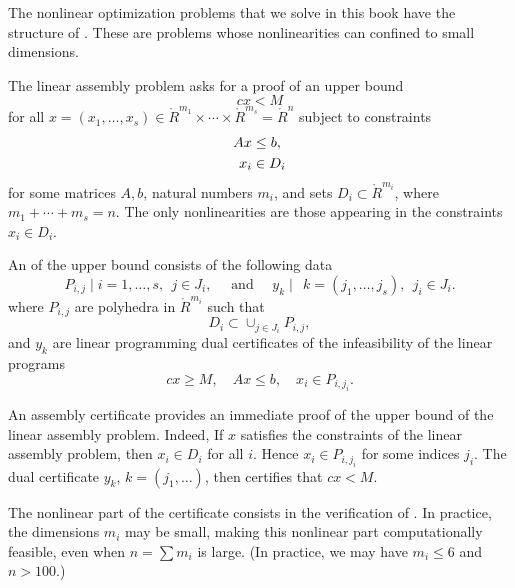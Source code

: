The nonlinear optimization problems that we solve in this book have
the structure of .  These are
problems whose nonlinearities can confined to small dimensions.

The linear assembly problem asks for a proof of an upper bound
\begin{equation}\label{eqn:cxM}
c x < M
\end{equation}
for all $x=(x_1,\ldots,x_s)\in \ring{R}^{m_1}\times\cdots
\times\ring{R}^{m_s}=\ring{R}^n$
subject to constraints
\begin{align}
A x &\le b,\notag\\
x_i &\in D_i\notag
\end{align}
for some matrices $A,b$, natural numbers $m_i$, and sets $D_i\subset
\ring{R}^{m_i}$, where $m_1+\cdots+m_s = n$.  The only nonlinearities
are those appearing in the constraints $x_i\in D_i$.

An  of the upper bound 
consists of the following data
\[
P_{i,j}\mid i=1,\ldots,s,~~j\in J_i,\quad\text{ and }\quad 
y_k\mid~~k=(j_1,\ldots,j_s),~~j_i\in J_i.
\]
where $P_{i,j}$ are polyhedra in $\ring{R}^{m_i}$ such that 
\begin{equation}\label{eqn:DP}
D_i \subset\cup_{j\in J_i} P_{i,j},
\end{equation} and $y_k$ are linear programming
dual certificates of the infeasibility of the linear programs
\[
c x \ge M,\quad A x \le b,\quad x_i\in P_{i,j_i}.
\]

An assembly certificate provides an immediate proof of the upper bound
of the linear assembly problem.  Indeed, If $x$ satisfies the
constraints of the linear assembly problem, then $x_i\in D_i$ for all
$i$.  Hence $x_i\in P_{i,j_i}$ for some indices $j_i$.  The dual
certificate $y_k$, $k=(j_1,\ldots)$, then certifies that $c x < M$.

The nonlinear part of the certificate consists in the verification
of .  In practice, the dimensions $m_i$
may be small, making this nonlinear part computationally feasible,
even when $n=\sum m_i$ is large.  (In practice, we may have $m_i\le 6$
and $n > 100$.)

